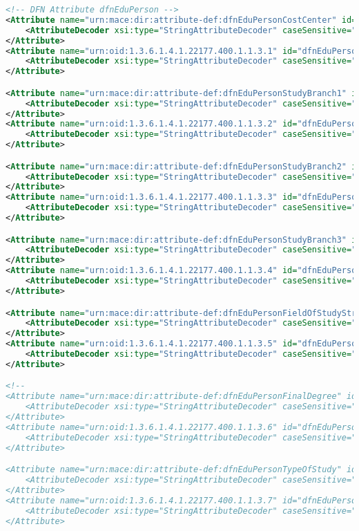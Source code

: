 \begin{lstlisting}[language=xml]
<!-- DFN Attribute dfnEduPerson -->
<Attribute name="urn:mace:dir:attribute-def:dfnEduPersonCostCenter" id="dfnEduPersonCostCenter">
	<AttributeDecoder xsi:type="StringAttributeDecoder" caseSensitive="false"/>
</Attribute>
<Attribute name="urn:oid:1.3.6.1.4.1.22177.400.1.1.3.1" id="dfnEduPersonCostCenter">
	<AttributeDecoder xsi:type="StringAttributeDecoder" caseSensitive="false"/>
</Attribute>

<Attribute name="urn:mace:dir:attribute-def:dfnEduPersonStudyBranch1" id="dfnEduPersonStudyBranch1">
	<AttributeDecoder xsi:type="StringAttributeDecoder" caseSensitive="false"/>
</Attribute>
<Attribute name="urn:oid:1.3.6.1.4.1.22177.400.1.1.3.2" id="dfnEduPersonStudyBranch1">
	<AttributeDecoder xsi:type="StringAttributeDecoder" caseSensitive="false"/>
</Attribute>

<Attribute name="urn:mace:dir:attribute-def:dfnEduPersonStudyBranch2" id="dfnEduPersonStudyBranch2">
	<AttributeDecoder xsi:type="StringAttributeDecoder" caseSensitive="false"/>
</Attribute>
<Attribute name="urn:oid:1.3.6.1.4.1.22177.400.1.1.3.3" id="dfnEduPersonStudyBranch2">
	<AttributeDecoder xsi:type="StringAttributeDecoder" caseSensitive="false"/>
</Attribute>

<Attribute name="urn:mace:dir:attribute-def:dfnEduPersonStudyBranch3" id="dfnEduPersonStudyBranch3">
	<AttributeDecoder xsi:type="StringAttributeDecoder" caseSensitive="false"/>
</Attribute>
<Attribute name="urn:oid:1.3.6.1.4.1.22177.400.1.1.3.4" id="dfnEduPersonStudyBranch3">
	<AttributeDecoder xsi:type="StringAttributeDecoder" caseSensitive="false"/>
</Attribute>

<Attribute name="urn:mace:dir:attribute-def:dfnEduPersonFieldOfStudyString" id="dfnEduPersonFieldOfStudyString">
	<AttributeDecoder xsi:type="StringAttributeDecoder" caseSensitive="false"/>
</Attribute>
<Attribute name="urn:oid:1.3.6.1.4.1.22177.400.1.1.3.5" id="dfnEduPersonFieldOfStudyString">
	<AttributeDecoder xsi:type="StringAttributeDecoder" caseSensitive="false"/>
</Attribute>

<!--
<Attribute name="urn:mace:dir:attribute-def:dfnEduPersonFinalDegree" id="dfnEduPersonFinalDegree">
	<AttributeDecoder xsi:type="StringAttributeDecoder" caseSensitive="false"/>
</Attribute>
<Attribute name="urn:oid:1.3.6.1.4.1.22177.400.1.1.3.6" id="dfnEduPersonFinalDegree">
	<AttributeDecoder xsi:type="StringAttributeDecoder" caseSensitive="false"/>
</Attribute>

<Attribute name="urn:mace:dir:attribute-def:dfnEduPersonTypeOfStudy" id="dfnEduPersonTypeOfStudy">
	<AttributeDecoder xsi:type="StringAttributeDecoder" caseSensitive="false"/>
</Attribute>
<Attribute name="urn:oid:1.3.6.1.4.1.22177.400.1.1.3.7" id="dfnEduPersonTypeOfStudy">
	<AttributeDecoder xsi:type="StringAttributeDecoder" caseSensitive="false"/>
</Attribute>


\end{lstlisting}
